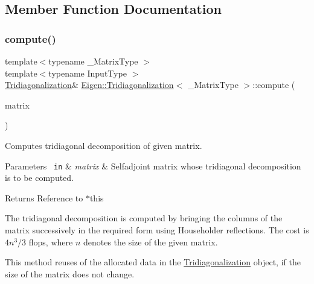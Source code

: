 \subsection{Member Function Documentation}
\mbox{\label{class_eigen_1_1_tridiagonalization_acd288abb081d3b40b87e4b98cd8f6ee9}} 
\subsubsection{\texorpdfstring{compute()}{compute()}}
{\footnotesize\ttfamily template$<$typename \+\_\+\+Matrix\+Type $>$ \\
template$<$typename Input\+Type $>$ \\
\mbox{\hyperlink{class_eigen_1_1_tridiagonalization}{Tridiagonalization}}\& \mbox{\hyperlink{class_eigen_1_1_tridiagonalization}{Eigen\+::\+Tridiagonalization}}$<$ \+\_\+\+Matrix\+Type $>$\+::compute (\begin{DoxyParamCaption}\item[{const \mbox{\hyperlink{struct_eigen_1_1_eigen_base}{Eigen\+Base}}$<$ Input\+Type $>$ \&}]{matrix }\end{DoxyParamCaption})\hspace{0.3cm}{\ttfamily [inline]}}



Computes tridiagonal decomposition of given matrix. 


\begin{DoxyParams}[1]{Parameters}
\mbox{\texttt{ in}}  & {\em matrix} & Selfadjoint matrix whose tridiagonal decomposition is to be computed. \\
\hline
\end{DoxyParams}
\begin{DoxyReturn}{Returns}
Reference to {\ttfamily $\ast$this} 
\end{DoxyReturn}
The tridiagonal decomposition is computed by bringing the columns of the matrix successively in the required form using Householder reflections. The cost is $ 4n^3/3 $ flops, where $ n $ denotes the size of the given matrix.

This method reuses of the allocated data in the \mbox{\hyperlink{class_eigen_1_1_tridiagonalization}{Tridiagonalization}} object, if the size of the matrix does not change.

